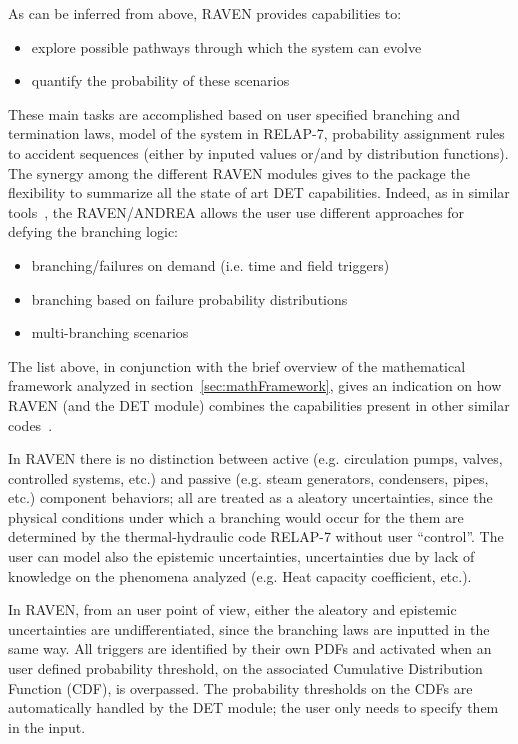As can be inferred from above, RAVEN provides capabilities to:
\vspace{-5mm}
\begin{itemize}
\itemsep0em
\item explore possible pathways through which the system can evolve
\item quantify the probability of these scenarios
\end{itemize}
\vspace{-5mm}
These main tasks are accomplished based on user specified branching and termination laws, model of the system in RELAP-7, probability assignment rules to accident sequences (either by inputed values or/and by distribution functions).
The synergy among the different RAVEN modules gives to the package the flexibility to summarize all the state of art DET capabilities. 
Indeed, as in similar tools~\cite{ADAPTHakobyan}, the RAVEN/ANDREA allows the user use different approaches for defying the branching logic:
\vspace{-5mm}
\begin{itemize}
\itemsep0em
\item branching/failures on demand (i.e. time and field triggers)
\item branching based on failure probability distributions
\item multi-branching scenarios
\end{itemize}
\vspace{-5mm}
The list above, in conjunction with the brief overview of the mathematical framework analyzed in section~\ref{sec:mathFramework}, gives an indication on how RAVEN (and the DET module) combines the capabilities present in other similar codes~\cite{ADAPTHakobyan}.  

In RAVEN there is no distinction between active (e.g. circulation pumps, valves, controlled systems, etc.) and passive (e.g. steam generators, condensers, pipes, etc.) component behaviors; all are treated as a aleatory uncertainties, since the physical conditions under which a branching would occur for the them are determined by the thermal-hydraulic code RELAP-7 without user ``control''. The user can model also the epistemic uncertainties, uncertainties due by lack of knowledge on the phenomena analyzed (e.g. Heat capacity coefficient, etc.). 

In RAVEN, from an user point of view, either the aleatory and epistemic uncertainties are undifferentiated, since the branching laws are inputted in the same way. All triggers are identified by their own PDFs and activated when an user defined probability threshold, on the associated Cumulative Distribution Function (CDF), is overpassed.
The probability thresholds on the CDFs are automatically handled by the DET module; the user only needs to specify them in the input.

